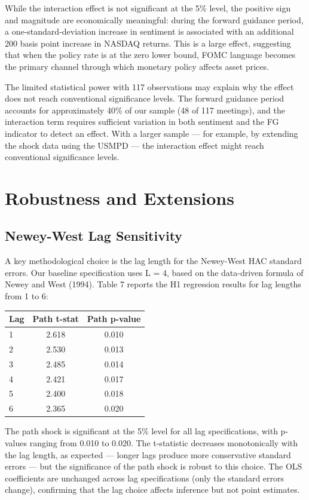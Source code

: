 \documentclass[12pt]{article}
\begin{document}
While the interaction effect is not significant at the 5\% level, the positive sign and magnitude are economically meaningful: during the forward guidance period, a one-standard-deviation increase in sentiment is associated with an additional 200 basis point increase in NASDAQ returns. This is a large effect, suggesting that when the policy rate is at the zero lower bound, FOMC language becomes the primary channel through which monetary policy affects asset prices.

The limited statistical power with 117 observations may explain why the effect does not reach conventional significance levels. The forward guidance period accounts for approximately 40\% of our sample (48 of 117 meetings), and the interaction term requires sufficient variation in both sentiment and the FG indicator to detect an effect. With a larger sample --- for example, by extending the shock data using the USMPD --- the interaction effect might reach conventional significance levels.


\section{Robustness and Extensions}

\subsection{Newey-West Lag Sensitivity}

A key methodological choice is the lag length for the Newey-West HAC standard errors. Our baseline specification uses L = 4, based on the data-driven formula of Newey and West (1994). Table 7 reports the H1 regression results for lag lengths from 1 to 6:

\begin{table}[htbp]\centering
\begin{tabular}{lcc}\toprule
Lag & Path t-stat & Path p-value \\\midrule
1 & 2.618 & 0.010 \\
2 & 2.530 & 0.013 \\
3 & 2.485 & 0.014 \\
4 & 2.421 & 0.017 \\
5 & 2.400 & 0.018 \\
6 & 2.365 & 0.020 \\
\bottomrule\end{tabular}
\end{table}

The path shock is significant at the 5\% level for all lag specifications, with p-values ranging from 0.010 to 0.020. The t-statistic decreases monotonically with the lag length, as expected --- longer lags produce more conservative standard errors --- but the significance of the path shock is robust to this choice. The OLS coefficients are unchanged across lag specifications (only the standard errors change), confirming that the lag choice affects inference but not point estimates.
\end{document}
